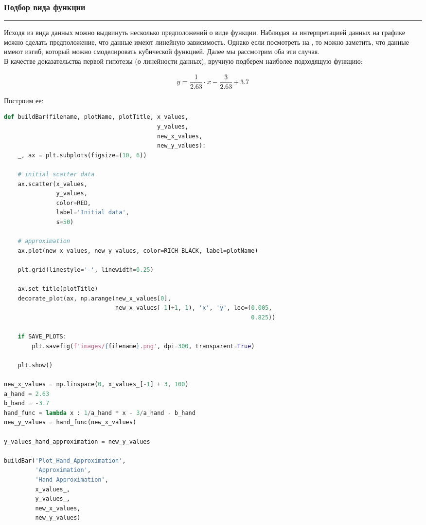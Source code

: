\documentclass[a4paper, 14pt]{extarticle}
\begin{document}
\subsubsection*{{Подбор вида функции}}\vspace{-20pt}\rule{\linewidth}{0.1mm}

Исходя из вида данных можно выдвинуть несколько предположений о виде функции. Наблюдая за 
интерпретацией данных на графике  можно сделать предположение, что данные 
имеют линейную зависимость. Однако если посмотреть на , то можно 
заметить, что данные имеют изгиб, который можно смоделировать кубической функцией. Далее 
мы рассмотрим оба эти случая.\\

В качестве доказательства первой гипотезы (о линейности данных), вручную подберем наиболее 
подходящую функцию:

\begin{equation*}
    y = \cfrac{1}{2.63} \cdot x - \cfrac{3}{2.63} + 3.7
\end{equation*}

Построим ее:

\newpage\vfill\null\null

\begin{center}
    \begin{lstlisting}[language=Python]
def buildBar(filename, plotName, plotTitle, x_values, 
                                            y_values, 
                                            new_x_values, 
                                            new_y_values):
    _, ax = plt.subplots(figsize=(10, 6))

    # initial scatter data
    ax.scatter(x_values, 
               y_values, 
               color=RED,
               label='Initial data',
               s=50)

    # approximation
    ax.plot(new_x_values, new_y_values, color=RICH_BLACK, label=plotName)

    plt.grid(linestyle='-', linewidth=0.25)

    ax.set_title(plotTitle)
    decorate_plot(ax, np.arange(new_x_values[0], 
                                new_x_values[-1]+1, 1), 'x', 'y', loc=(0.005, 
                                                                       0.825))
    
    if SAVE_PLOTS:
        plt.savefig(f'images/{filename}.png', dpi=300, transparent=True)

    plt.show()

new_x_values = np.linspace(0, x_values_[-1] + 3, 100)
a_hand = 2.63
b_hand = -3.7
hand_func = lambda x : 1/a_hand * x - 3/a_hand - b_hand
new_y_values = hand_func(new_x_values)

y_values_hand_approximation = new_y_values

buildBar('Plot_Hand_Approximation', 
         'Approximation', 
         'Hand Approximation', 
         x_values_, 
         y_values_, 
         new_x_values, 
         new_y_values)
    \end{lstlisting}
\end{center}
\end{document}
